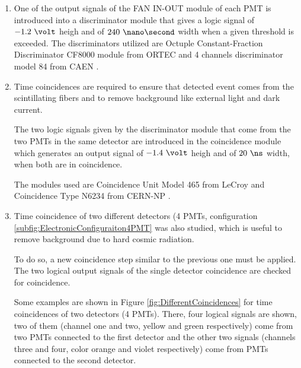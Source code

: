 \begin{enumerate}
\begin{enumerate}

\item{} One of the output signals of the FAN IN-OUT module of each PMT is introduced into a discriminator module that gives a logic signal of $-1.2~\volt$ heigh and of $240~\nano\second$ width when a given threshold is exceeded. The discriminators utilized are  Octuple Constant-Fraction Discriminator CF8000 module from ORTEC \cite{DataSheetDiscriminator} and 4 channels discriminator model 84 from CAEN \cite{DataSheetDiscriminatorCAEN}.

\item{} Time coincidences are required to ensure that detected event comes from the scintillating fibers and to remove background like external light and dark current. %

The two logic signals given by the discriminator module that come from the two PMTs in the same detector are introduced in the coincidence module which generates an output signal of $-1.4~\volt$ heigh and of $20~\ns$ width, when both are in coincidence.

The modules used are Coincidence Unit Model 465 from LeCroy \cite{DataSheetCoincidenceLeCroy} and Coincidence Type N6234 from CERN-NP \cite{DataSheetCoincidenceCERN}.

\item{} Time coincidence of two different detectors (4 PMTs, configuration \ref{subfig:ElectronicConfiguraiton4PMT} was also studied, which is useful to remove background due to hard cosmic radiation.

To do so, a new coincidence step similar to the previous one must be applied. The two logical output signals of the single detector coincidence are checked for coincidence.

Some examples are shown in Figure \ref{fig:DifferentCoincidences} for time coincidences of two detectors (4 PMTs). There, four logical signals are shown, two of them (channel one and two, yellow and green respectively) come from two PMTs connected to the first detector and the other two signals (channels three and four, color orange and violet respectively) come from PMTs connected to the second detector.


\end{enumerate}
\end{enumerate}
